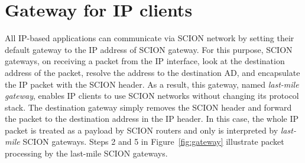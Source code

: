\section{Gateway for IP clients}
All IP-based applications can communicate via SCION network by setting their default gateway to the IP address of SCION gateway. For this purpose, SCION gateways, on receiving a packet from the IP interface, look at the destination address of the packet, resolve the address to the destination AD, and encapsulate the IP packet with the SCION header. As a result, this gateway, named {\em last-mile gateway}, enables IP clients to use SCION networks without changing its protocol stack. The destination gateway simply removes the SCION header and forward the packet to the destination address in the IP header. In this case, the whole IP packet is treated as a payload by SCION routers and only is interpreted by {\em last-mile} SCION gateways. Steps 2 and 5 in Figure~\ref{fig:gateway} illustrate packet processing by the last-mile SCION gateways.

